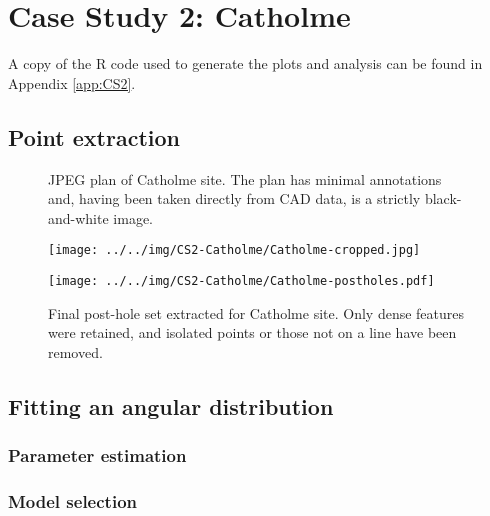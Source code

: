 \documentclass[../../ArchStats.tex]{subfiles}
\begin{document}
\section{Case Study 2: Catholme}
\label{sec:CS2}

A copy of the R code used to generate the plots and analysis can be found in Appendix \ref{app:CS2}.

\subsection{Point extraction}


 \begin{figure}[h!]
 \begin{minipage}[l]{0.47\textwidth}
 \caption{JPEG plan of Catholme site. The plan has minimal annotations and, having been taken directly from CAD data, is a strictly black-and-white image.}
 \centering
 \texttt{[image: ../../img/CS2-Catholme/Catholme-cropped.jpg]}
 \end{minipage}
 \hfill
	\begin{minipage}[r]{0.47\textwidth}
	\caption{Final post-hole set extracted for Catholme site. Only dense features were retained, and isolated points or those not on a line have been removed.}
	\centering
	\texttt{[image: ../../img/CS2-Catholme/Catholme-postholes.pdf]}
    \end{minipage}
 \end{figure}



\subsection{Fitting an angular distribution}

\subsubsection{Parameter estimation}
\subsubsection{Model selection}
\end{document}
